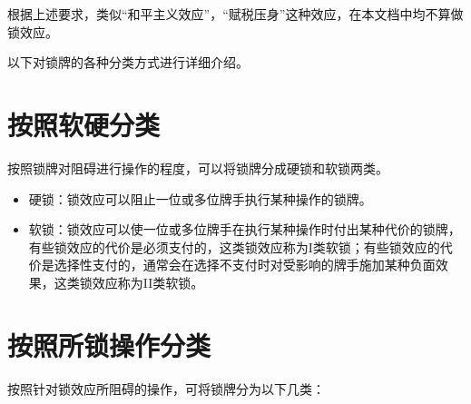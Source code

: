 \documentclass[lang = cn, color = black, 10pt]{AllThatStax}
\begin{document}
根据上述要求，类似“和平主义效应”，“赋税压身”这种效应，在本文档中均不算做锁效应。

以下对锁牌的各种分类方式进行详细介绍。

\section*{按照软硬分类}

按照锁牌对阻碍进行操作的程度，可以将锁牌分成硬锁和软锁两类。

\begin{itemize}
    \item 硬锁：锁效应可以阻止一位或多位牌手执行某种操作的锁牌。
    \item 软锁：锁效应可以使一位或多位牌手在执行某种操作时付出某种代价的锁牌，有些锁效应的代价是必须支付的，这类锁效应称为I类软锁；有些锁效应的代价是选择性支付的，通常会在选择不支付时对受影响的牌手施加某种负面效果，这类锁效应称为II类软锁。
\end{itemize}

\section*{按照所锁操作分类}

按照针对锁效应所阻碍的操作，可将锁牌分为以下几类：
\end{document}
